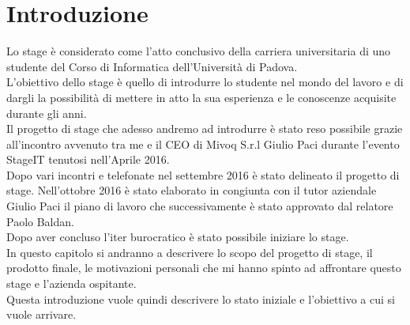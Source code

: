 \chapter{Introduzione} %
Lo stage è considerato come l'atto conclusivo della carriera universitaria di uno studente del Corso di Informatica dell'Università di Padova.\\
L'obiettivo dello stage è quello di introdurre lo studente nel mondo del lavoro e di dargli la possibilità di mettere in atto la sua esperienza e le conoscenze acquisite durante gli anni.\\
Il progetto di stage che adesso andremo ad introdurre è stato reso possibile grazie all'incontro avvenuto tra me e il CEO di Mivoq S.r.l Giulio Paci durante l'evento StageIT tenutosi nell'Aprile 2016.\\
Dopo vari incontri e telefonate nel settembre 2016 è stato delineato il progetto di stage.
Nell'ottobre 2016 è stato elaborato in congiunta con il tutor aziendale Giulio Paci il piano di lavoro che successivamente è stato approvato dal relatore Paolo Baldan.\\
Dopo aver concluso l'iter burocratico è stato possibile iniziare lo stage.\\    
In questo capitolo si andranno a descrivere lo scopo del progetto di stage, il prodotto finale, le motivazioni personali che mi hanno spinto ad affrontare questo stage e l'azienda ospitante.\\
Questa introduzione vuole quindi descrivere lo stato iniziale e l'obiettivo a cui si vuole arrivare.
\thispagestyle{empty}
\newpage
